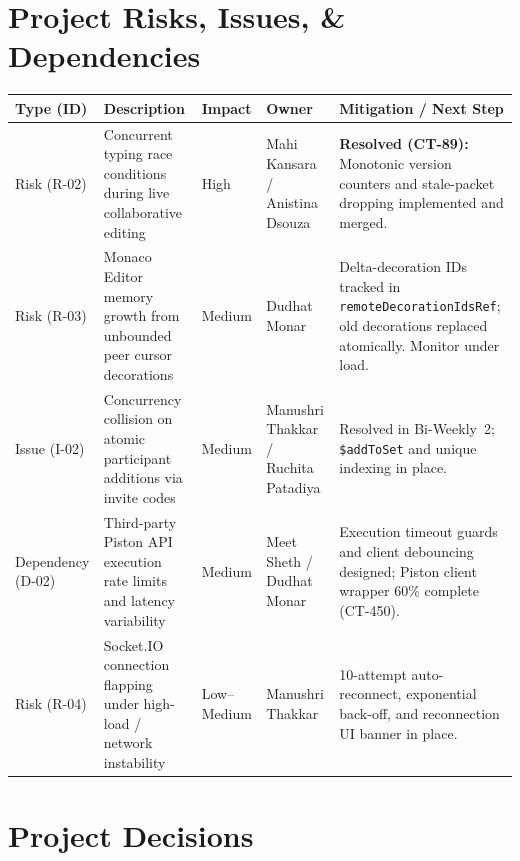 \documentclass[11pt,a4paper]{article}
\begin{document}
\section{Project Risks, Issues, \& Dependencies}

\begin{tabular}{p{} p{} p{} p{} p{}}
\toprule
\textbf{Type (ID)} & \textbf{Description} & \textbf{Impact} & \textbf{Owner} & \textbf{Mitigation / Next Step} \\
\midrule
Risk (R-02) & Concurrent typing race conditions during live collaborative editing & High & Mahi Kansara / Anistina Dsouza & \textbf{Resolved (CT-89):} Monotonic version counters and stale-packet dropping implemented and merged. \\
Risk (R-03) & Monaco Editor memory growth from unbounded peer cursor decorations & Medium & Dudhat Monar & Delta-decoration IDs tracked in \texttt{remoteDecorationIdsRef}; old decorations replaced atomically. Monitor under load. \\
Issue (I-02) & Concurrency collision on atomic participant additions via invite codes & Medium & Manushri Thakkar / Ruchita Patadiya & Resolved in Bi-Weekly~2; \texttt{\$addToSet} and unique indexing in place. \\
Dependency (D-02) & Third-party Piston API execution rate limits and latency variability & Medium & Meet Sheth / Dudhat Monar & Execution timeout guards and client debouncing designed; Piston client wrapper 60\% complete (CT-450). \\
Risk (R-04) & Socket.IO connection flapping under high-load / network instability & Low--Medium & Manushri Thakkar & 10-attempt auto-reconnect, exponential back-off, and reconnection UI banner in place. \\
\bottomrule
\end{tabular}

\section{Project Decisions}
\end{document}
